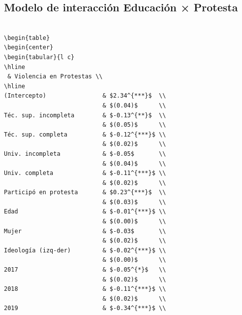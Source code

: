 \documentclass[
  12pt,
]{article}
\begin{document}
\subsection{Modelo de interacción Educación ×
Protesta}\label{modelo-de-interacciuxf3n-educaciuxf3n-protesta}

\begin{verbatim}

\begin{table}
\begin{center}
\begin{tabular}{l c}
\hline
 & Violencia en Protestas \\
\hline
(Intercepto)                & $2.34^{***}$  \\
                            & $(0.04)$      \\
Téc. sup. incompleta        & $-0.13^{**}$  \\
                            & $(0.05)$      \\
Téc. sup. completa          & $-0.12^{***}$ \\
                            & $(0.02)$      \\
Univ. incompleta            & $-0.05$       \\
                            & $(0.04)$      \\
Univ. completa              & $-0.11^{***}$ \\
                            & $(0.02)$      \\
Participó en protesta       & $0.23^{***}$  \\
                            & $(0.03)$      \\
Edad                        & $-0.01^{***}$ \\
                            & $(0.00)$      \\
Mujer                       & $-0.03$       \\
                            & $(0.02)$      \\
Ideología (izq-der)         & $-0.02^{***}$ \\
                            & $(0.00)$      \\
2017                        & $-0.05^{*}$   \\
                            & $(0.02)$      \\
2018                        & $-0.11^{***}$ \\
                            & $(0.02)$      \\
2019                        & $-0.34^{***}$ \\

\end{verbatim}
\end{document}
